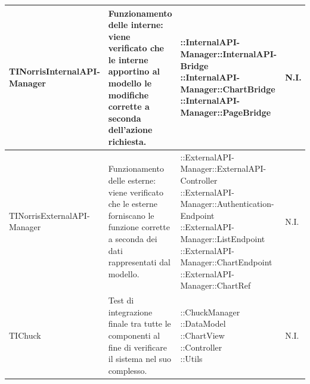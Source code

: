 \begin{longtabu}{| X | X | X[0.9] | X[0.3] |}
	\parbox[t]{0.6\textwidth}{TINorrisInternalAPI-\\Manager}
	&
Funzionamento delle  interne: viene verificato che le  interne apportino al modello le modifiche corrette a seconda dell'azione richiesta.
& \parbox[t]{0.6\textwidth}{
::InternalAPI-\\Manager::InternalAPI-\\Bridge\\
::InternalAPI-\\Manager::ChartBridge\\
::InternalAPI-\\Manager::PageBridge}
			& N.I.
			\\ \hline



	\parbox[t]{0.6\textwidth}{TINorrisExternalAPI-\\Manager}
	&
Funzionamento delle  esterne: viene verificato che le  esterne forniscano le funzione corrette a seconda dei dati rappresentati dal modello.
& \parbox[t]{0.6\textwidth}{
::ExternalAPI-\\Manager::ExternalAPI-\\Controller\\
::ExternalAPI-\\Manager::Authentication-\\Endpoint\\
::ExternalAPI-\\Manager::ListEndpoint\\
::ExternalAPI-\\Manager::ChartEndpoint\\
::ExternalAPI-\\Manager::ChartRef}
			& N.I.
			\\ \hline











	TIChuck
				&
Test di integrazione finale tra tutte le componenti al fine di verificare il sistema nel suo complesso.
			& \parbox[t]{0.6\textwidth}{
::ChuckManager\\
::DataModel\\
::ChartView\\
::Controller\\
::Utils}
			& N.I.
			\\ \hline




\end{longtabu}
